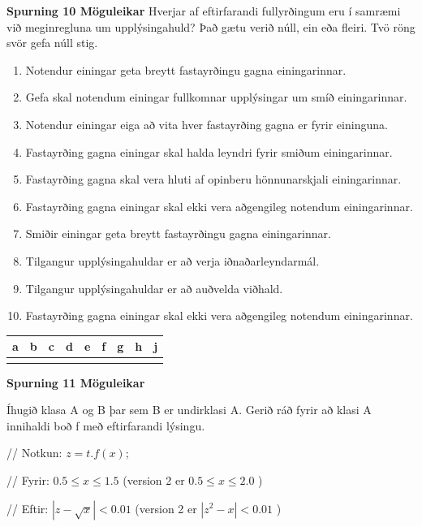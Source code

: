 \documentclass{article}
\newcommand{\bo}[1]{\textbf{#1}}
\newcommand{\enum}{\begin{enumerate}[label = \alph*.]}
\begin{document}
\vspace{2cm}

\bo{Spurning 10 Möguleikar}
Hverjar af eftirfarandi fullyrðingum eru í samræmi við meginregluna
um upplýsingahuld? Það gætu verið núll, ein eða fleiri. Tvö röng
svör gefa núll stig.

\enum
\item Notendur einingar geta breytt fastayrðingu gagna
einingarinnar.
\item Gefa skal notendum einingar fullkomnar upplýsingar um smíð
einingarinnar.
\item Notendur einingar eiga að vita hver fastayrðing gagna er fyrir
eininguna.
\item Fastayrðing gagna einingar skal halda leyndri fyrir smiðum
einingarinnar.
\item Fastayrðing gagna skal vera hluti af opinberu hönnunarskjali
einingarinnar.
\item Fastayrðing gagna einingar skal ekki vera aðgengileg
notendum einingarinnar.
\item Smiðir einingar geta breytt fastayrðingu gagna einingarinnar.
\item Tilgangur upplýsingahuldar er að verja iðnaðarleyndarmál.
\item Tilgangur upplýsingahuldar er að auðvelda viðhald.
\item Fastayrðing gagna einingar skal ekki vera aðgengileg
notendum einingarinnar.

\end{enumerate}

\begin{tabularx}{\textwidth}{|X|X|X|X|X|X|X|X|X|}
    \hline
    \bo{a} & \bo{b} & \bo{c} & \bo{d} & \bo{e} & \bo{f} & \bo{g} & \bo{h} & \bo{j} \\ \hline
     & & & & & & & & \\ \hline
\end{tabularx}



\newpage

\bo{Spurning 11 Möguleikar}

    Íhugið klasa A og B þar sem B er undirklasi A. Gerið ráð fyrir að
    klasi A innihaldi boð f með eftirfarandi lýsingu.


    // Notkun: $z = t.f(x);$


    // Fyrir: $0.5 \leq x \leq 1.5$ (version 2 er $0.5 \leq x \leq 2.0$ )


    // Eftir: $|z - \sqrt{x}| < 0.01$ (version 2 er $|z^2 - x| < 0.01$ )
\end{document}
